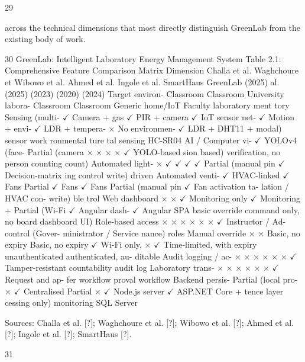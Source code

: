 29


across the technical dimensions that most directly distinguish GreenLab from the existing
body of work.




30
GreenLab: Intelligent Laboratory Energy Management System
Table 2.1: Comprehensive Feature Comparison Matrix
Dimension Challa et al. Waghchoure et Wibowo et al. Ahmed et al. Ingole et al. SmartHaus GreenLab
(2025) al. (2025) (2023) (2020) (2024)
Target environ- Classroom Classroom University labora- Classroom Classroom Generic home/IoT Faculty laboratory
ment tory
Sensing (multi- $\checkmark$ Camera + gas $\checkmark$ PIR + camera $\checkmark$ IoT sensor net- $\checkmark$ Motion + envi- $\checkmark$ LDR + tempera- × No environmen- $\checkmark$ LDR + DHT11 +
modal) sensor work ronmental ture tal sensing HC-SR04
AI / Computer vi- $\checkmark$ YOLOv4 (face- Partial (camera × × × × $\checkmark$ YOLO-based
sion based) veriﬁcation, no person counting
count)
Automated light- × $\checkmark$ $\checkmark$ $\checkmark$ $\checkmark$ Partial (manual pin $\checkmark$ Decision-matrix
ing control write) driven
Automated venti- $\checkmark$ HVAC-linked $\checkmark$ Fans Partial $\checkmark$ Fans $\checkmark$ Fans Partial (manual pin $\checkmark$ Fan activation ta-
lation / HVAC con- write) ble
trol
Web dashboard × × $\checkmark$ Monitoring only $\checkmark$ Monitoring + Partial (Wi-Fi $\checkmark$ Angular dash- $\checkmark$ Angular SPA
basic override command only, no board dashboard
UI)
Role-based access × × × × × × $\checkmark$ Instructor / Ad-
control (Gover- ministrator / Service
nance) roles
Manual override × × Basic, no expiry Basic, no expiry $\checkmark$ Wi-Fi only, × $\checkmark$ Time-limited,
with expiry unauthenticated authenticated, au-
ditable
Audit logging / ac- × × × × × × $\checkmark$ Tamper-resistant
countability audit log
Laboratory trans- × × × × × × $\checkmark$ Request and ap-
fer workﬂow proval workﬂow
Backend persis- Partial (local pro- × $\checkmark$ Centralised Partial × $\checkmark$ Node.js server $\checkmark$ ASP.NET Core +
tence layer cessing only) monitoring SQL Server

Sources: Challa et al. [?]; Waghchoure et al. [?]; Wibowo et al. [?]; Ahmed et al. [?]; Ingole et al. [?]; SmartHaus [?].




31


